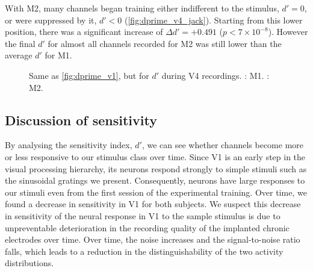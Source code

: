 With \ac{M2}, many channels began training either indifferent to the stimulus, $d'=0$, or were suppressed by it, $d'<0$ (\autoref{fig:dprime_v4_jack}).
Starting from this lower position, there was a significant increase of $\Delta d' = +0.491$ ($p < 7 \times 10 ^{-8}$).
However the final $d'$ for almost all channels recorded for \ac{M2} was still lower than the average $d'$ for \ac{M1}.

\begin{figure}[htbp]
    \centering
    \hspace*{\fill}
    \hspace*{\fill}\hspace{.2cm}\hspace*{\fill}
    \hspace*{\fill}
    \caption{Same as \autoref{fig:dprime_v1}, but for $d'$ during \ac{V4} recordings.
\protect{}: \ac{M1}.
\protect{}: \ac{M2}.
}
    \label{fig:dprime_v4}
\end{figure}


\subsection{Discussion of sensitivity}
\label{sec:pl_dprime_discuss}

By analysing the sensitivity index, $d'$, we can see whether channels become more or less responsive to our stimulus class over time.
Since \ac{V1} is an early step in the visual processing hierarchy, its neurons respond strongly to simple stimuli such as the sinusoidal gratings we present.
Consequently, neurons have large responses to our stimuli even from the first session of the experimental training.
Over time, we found a decrease in sensitivity in \ac{V1} for both subjects.
We suspect this decrease in sensitivity of the neural response in \ac{V1} to the sample stimulus is due to unpreventable deterioration in the recording quality of the implanted chronic electrodes over time.
Over time, the noise increases and the signal-to-noise ratio falls, which leads to a reduction in the distinguishability of the two activity distributions.

